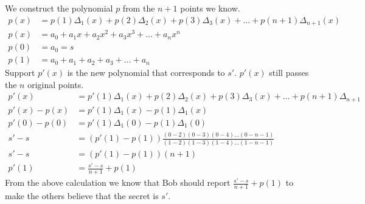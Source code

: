 \documentclass[11pt]{article}
\begin{document}
\begin{Answer}
    We construct the polynomial $p$ from the $n+1$ points we know. 
    \begin{align*}
        p(x) &= p(1)\Delta_1(x) + p(2)\Delta_2(x) + p(3)\Delta_3(x) + \ldots + p(n + 1)\Delta_{n + 1}(x) \\
        p(x) &= a_0 + a_1x + a_2x^2 + a_3x^3 + \ldots + a_nx^n \\
        p(0) &= a_0 = s \\
        p(1) &= a_0 + a_1 + a_2 + a_3 + \ldots + a_n
    \end{align*}
    Support $p'(x)$ is the new polynomial that corresponds to $s'$. $p'(x)$ still passes the $n$ original points.
    \begin{align*}
        p'(x)        &= p'(1)\Delta_1(x) + p(2)\Delta_2(x) + p(3)\Delta_3(x) + \ldots + p(n + 1)\Delta_{n + 1} \\
        p'(x) - p(x) &= p'(1)\Delta_1(x) - p(1)\Delta_1(x) \\
        p'(0) - p(0) &= p'(1)\Delta_1(0) - p(1)\Delta_1(0) \\
        s' - s       &= (p'(1) - p(1)) \frac{(0 - 2)(0 - 3)(0 - 4)\ldots(0 - n - 1)}{(1 - 2)(1 - 3)(1 - 4)\ldots(1 - n - 1)} \\
        s' - s       &= (p'(1) - p(1))(n + 1) \\
        p'(1)        &= \frac{s' - s}{n + 1} + p(1)
    \end{align*}
    From the above calculation we know that Bob should report $\frac{s' - s}{n + 1} + p(1)$ to make the others 
    believe that the secret is $s'$. 
\end{Answer}
\end{document}
